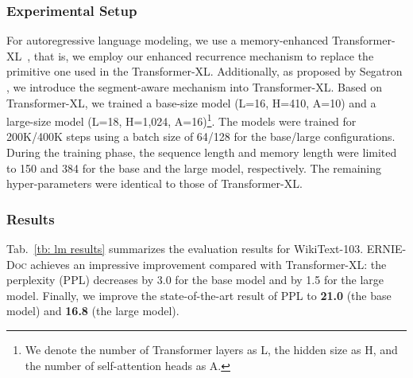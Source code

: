 \documentclass[11pt,a4paper]{article}
\newcommand{\mname}{\textsc{ERNIE-Doc}\xspace}
\begin{document}
\subsubsection{Experimental Setup}
For autoregressive language modeling, we use a memory-enhanced Transformer-XL~\citep{transformer_xl}, that is, we employ our enhanced recurrence mechanism to replace the primitive one used in the Transformer-XL. Additionally, as proposed by Segatron \citep{bai2020segabert}, we introduce the segment-aware mechanism into Transformer-XL. Based on Transformer-XL, we trained a base-size model (L=16, H=410, A=10) and a large-size model (L=18, H=1,024, A=16)\footnote{We denote the number of Transformer layers as L, the hidden size as H, and the number of self-attention heads as A.}. The models were trained for 200K/400K steps using a batch size of 64/128 for the base/large configurations. During the training phase, the sequence length and memory length were limited to 150 and 384 for the base and the large model, respectively. The remaining hyper-parameters were identical to those of Transformer-XL.

\subsubsection{Results}
Tab.~\ref{tb: lm results} summarizes the evaluation results for WikiText-103. \mname achieves an impressive improvement compared with Transformer-XL: the perplexity (PPL) decreases by 3.0 for the base model and by 1.5 for the large model. Finally, we improve the state-of-the-art result of PPL to \textbf{21.0} (the base model) and \textbf{16.8} (the large model).
\end{document}

